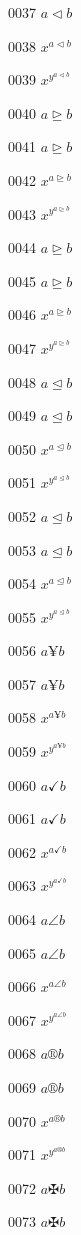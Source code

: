 \documentclass{article}
\begin{document}
0037 $\displaystyle a\vartriangleleft b$\par
0038 $x^{a\vartriangleleft b}$\par
0039 $x^{y^{a\vartriangleleft b}}$\par
0040 $a\trianglerighteq b$\par
0041 $\displaystyle a\trianglerighteq b$\par
0042 $x^{a\trianglerighteq b}$\par
0043 $x^{y^{a\trianglerighteq b}}$\par
0044 $a\unrhd b$\par
0045 $\displaystyle a\unrhd b$\par
0046 $x^{a\unrhd b}$\par
0047 $x^{y^{a\unrhd b}}$\par
0048 $a\trianglelefteq b$\par
0049 $\displaystyle a\trianglelefteq b$\par
0050 $x^{a\trianglelefteq b}$\par
0051 $x^{y^{a\trianglelefteq b}}$\par
0052 $a\unlhd b$\par
0053 $\displaystyle a\unlhd b$\par
0054 $x^{a\unlhd b}$\par
0055 $x^{y^{a\unlhd b}}$\par
0056 $a\yen b$\par
0057 $\displaystyle a\yen b$\par
0058 $x^{a\yen b}$\par
0059 $x^{y^{a\yen b}}$\par
0060 $a\checkmark b$\par
0061 $\displaystyle a\checkmark b$\par
0062 $x^{a\checkmark b}$\par
0063 $x^{y^{a\checkmark b}}$\par
0064 $a\angle b$\par
0065 $\displaystyle a\angle b$\par
0066 $x^{a\angle b}$\par
0067 $x^{y^{a\angle b}}$\par
0068 $a\circledR b$\par
0069 $\displaystyle a\circledR b$\par
0070 $x^{a\circledR b}$\par
0071 $x^{y^{a\circledR b}}$\par
0072 $a\maltese b$\par
0073 $\displaystyle a\maltese b$\par
\end{document}
